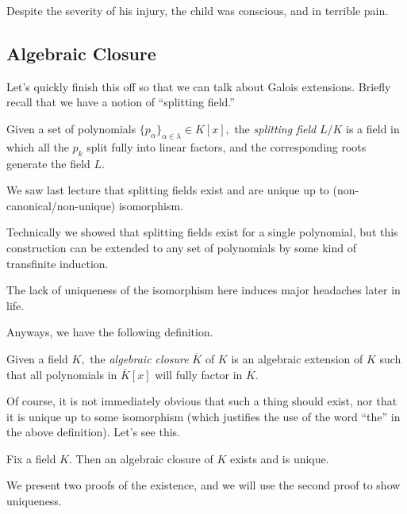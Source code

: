 \documentclass[../notes.tex]{subfiles}
\begin{document}















Despite the severity of his injury, the child was conscious, and in terrible pain.

\subsection{Algebraic Closure}
Let's quickly finish this off so that we can talk about Galois extensions. Briefly recall that we have a notion of ``splitting field.''
\begin{definition}
	Given a set of polynomials $\{p_\alpha\}_{\alpha\in\lambda}\in K[x],$ the \textit{splitting field} $L/K$ is a field in which all the $p_k$ split fully into linear factors, and the corresponding roots generate the field $L.$
\end{definition}
We saw last lecture that splitting fields exist and are unique up to (non-canonical/non-unique) isomorphism.
\begin{remark}
	Technically we showed that splitting fields exist for a single polynomial, but this construction can be extended to any set of polynomials by some kind of transfinite induction.
\end{remark}
\begin{remark}
	The lack of uniqueness of the isomorphism here induces major headaches later in life.
\end{remark}
Anyways, we have the following definition.
\begin{definition}
	Given a field $K,$ the \textit{algebraic closure} $\overline K$ of $K$ is an algebraic extension of $K$ such that all polynomials in $\overline K[x]$ will fully factor in $\overline K.$
\end{definition}
Of course, it is not immediately obvious that such a thing should exist, nor that it is unique up to some isomorphism (which justifies the use of the word ``the'' in the above definition). Let's see this.
\begin{proposition} \label{prop:algclose}
	Fix a field $K.$ Then an algebraic closure of $K$ exists and is unique.
\end{proposition}
We present two proofs of the existence, and we will use the second proof to show uniqueness.
\end{document}
